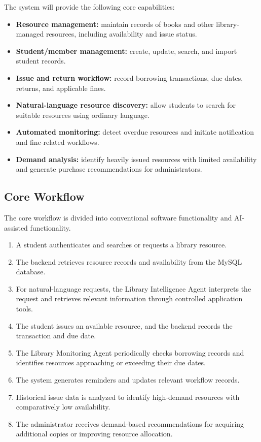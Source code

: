 \documentclass[11pt]{article}
\begin{document}
The system will provide the following core capabilities:
\begin{itemize}
    \item \textbf{Resource management:} maintain records of books and other library-managed resources, including availability and issue status.
    \item \textbf{Student/member management:} create, update, search, and import student records.
    \item \textbf{Issue and return workflow:} record borrowing transactions, due dates, returns, and applicable fines.
    \item \textbf{Natural-language resource discovery:} allow students to search for suitable resources using ordinary language.
    \item \textbf{Automated monitoring:} detect overdue resources and initiate notification and fine-related workflows.
    \item \textbf{Demand analysis:} identify heavily issued resources with limited availability and generate purchase recommendations for administrators.
\end{itemize}

\subsection{Core Workflow}
The core workflow is divided into conventional software functionality and AI-assisted functionality.
\begin{enumerate}
    \item A student authenticates and searches or requests a library resource.
    \item The backend retrieves resource records and availability from the MySQL database.
    \item For natural-language requests, the Library Intelligence Agent interprets the request and retrieves relevant information through controlled application tools.
    \item The student issues an available resource, and the backend records the transaction and due date.
    \item The Library Monitoring Agent periodically checks borrowing records and identifies resources approaching or exceeding their due dates.
    \item The system generates reminders and updates relevant workflow records.
    \item Historical issue data is analyzed to identify high-demand resources with comparatively low availability.
    \item The administrator receives demand-based recommendations for acquiring additional copies or improving resource allocation.
\end{enumerate}
\end{document}
